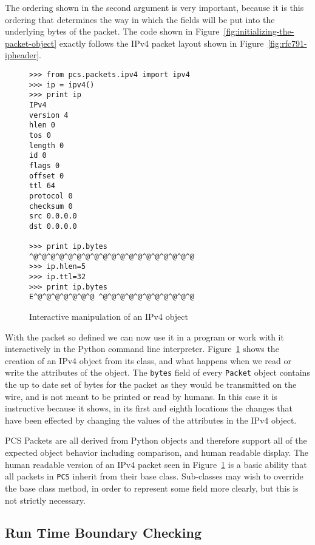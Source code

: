 \documentclass[pdftex]{article}
\begin{document}
The ordering shown in the second argument is very important, because
it is this ordering that determines the way in which the fields will
be put into the underlying bytes of the packet.  The code shown in
Figure~\ref{fig:initializing-the-packet-object} exactly follows the
IPv4 packet layout shown in Figure~\ref{fig:rfc791-ipheader}.

\begin{figure}
  \centering
\begin{lstlisting}
>>> from pcs.packets.ipv4 import ipv4
>>> ip = ipv4()
>>> print ip
IPv4
version 4
hlen 0
tos 0
length 0
id 0
flags 0
offset 0
ttl 64
protocol 0
checksum 0
src 0.0.0.0
dst 0.0.0.0

>>> print ip.bytes
^@^@^@^@^@^@^@^@^@^@^@^@^@^@^@^@^@^@^@
>>> ip.hlen=5
>>> ip.ttl=32
>>> print ip.bytes
E^@^@^@^@^@^@^@ ^@^@^@^@^@^@^@^@^@^@^@
\end{lstlisting}
\caption{Interactive manipulation of an IPv4 object}
  \label{fig:interactive-manipulation-of-an-ipv4-object}
\end{figure}

With the packet so defined we can now use it in a program or work with
it interactively in the Python command line interpreter.
Figure~\ref{fig:interactive-manipulation-of-an-ipv4-object} shows the
creation of an IPv4 object from its class, and what happens when we
read or write the attributes of the object.  The \verb|bytes| field of
every \verb|Packet| object contains the up to date set of bytes for
the packet as they would be transmitted on the wire, and is not meant
to be printed or read by humans.  In this case it is instructive
because it shows, in its first and eighth locations the changes that
have been effected by changing the values of the attributes in the
IPv4 object.

PCS Packets are all derived from Python objects and therefore support
all of the expected object behavior including comparison, and human
readable display.  The human readable version of an IPv4 packet seen
in Figure~\ref{fig:interactive-manipulation-of-an-ipv4-object} is a
basic ability that all packets in \verb|PCS| inherit from their
base class.  Sub-classes may wish to override the base class method,
in order to represent some field more clearly, but this is not
strictly necessary.

\subsection{Run Time Boundary Checking}
\label{sec:run-time-boundary-checking}
\end{document}
